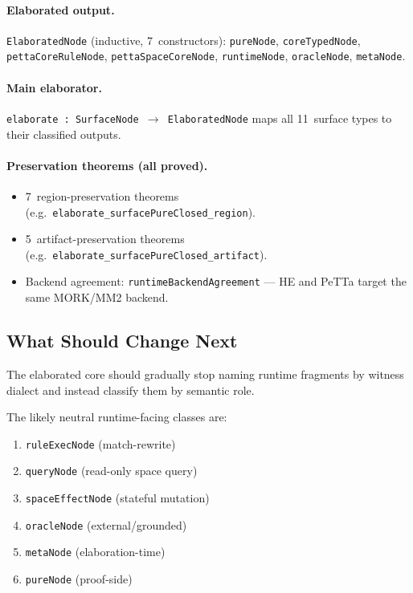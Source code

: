 \documentclass[11pt]{article}
\theoremstyle{remark}
\newcommand{\MORK}{\textup{MORK}}
\newcommand{\PeTTa}{\textup{PeTTa}}
\newcommand{\HE}{\textup{HE}}
\newcommand{\code}[1]{\texttt{#1}}
\newcommand{\leanref}[1]{\texttt{#1}}
\begin{document}
\paragraph{Elaborated output.}
\leanref{ElaboratedNode} (inductive, 7~constructors):
\code{pureNode}, \code{coreTypedNode}, \code{pettaCoreRuleNode},
\code{pettaSpaceCoreNode}, \code{runtimeNode}, \code{oracleNode},
\code{metaNode}.

\paragraph{Main elaborator.}
\leanref{elaborate : SurfaceNode $\to$ ElaboratedNode} maps all
11~surface types to their classified outputs.

\paragraph{Preservation theorems (all proved).}
\begin{itemize}[nosep]
  \item 7~region-preservation theorems (e.g.\
  \leanref{elaborate\_surfacePureClosed\_region}).
  \item 5~artifact-preservation theorems (e.g.\
  \leanref{elaborate\_surfacePureClosed\_artifact}).
  \item Backend agreement:
  \leanref{runtimeBackendAgreement} --- \HE{} and \PeTTa{} target the same
  \MORK{}/MM2 backend.
\end{itemize}

\subsection{What Should Change Next}

The elaborated core should gradually stop naming runtime fragments by witness
dialect and instead classify them by semantic role.

The likely neutral runtime-facing classes are:

\begin{enumerate}[nosep]
  \item \code{ruleExecNode} (match-rewrite)
  \item \code{queryNode} (read-only space query)
  \item \code{spaceEffectNode} (stateful mutation)
  \item \code{oracleNode} (external/grounded)
  \item \code{metaNode} (elaboration-time)
  \item \code{pureNode} (proof-side)
\end{enumerate}
\end{document}
